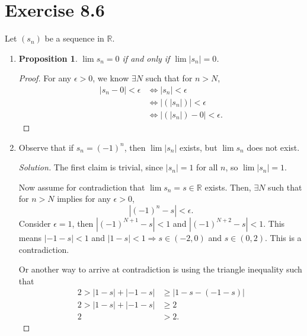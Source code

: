 \documentclass{article}
\newtheorem{proposition}[thm]{Proposition}
\begin{document}
\section*{Exercise 8.6}
Let $(s_n)$ be a sequence in $\mathbb{R}$.
\begin{enumerate}[label=(\alph*)]
    \item 
    \begin{proposition}
        $\lim s_n=0$ if and only if $\lim |s_n|=0$.
    \end{proposition}
    \begin{proof}
        For any $\epsilon>0$, we know $\exists N$ such that for $n>N$, 
        \begin{align*}
            |s_n-0| <\epsilon &\Leftrightarrow |s_n| < \epsilon \\
            &\Leftrightarrow |(|s_n|)| < \epsilon \\
            & \Leftrightarrow |(|s_n|)-0| < \epsilon.
        \end{align*}
    \end{proof}

    \item
    Observe that if $s_n = (-1)^n$, then $\lim|s_n|$ exists, but $\lim s_n$ does not exist.
    \begin{proof}[Solution]
        The first claim is trivial, since $|s_n| = 1$ for all $n$, so $\lim|s_n| = 1$.

        Now assume for contradiction that $\lim s_n = s\in\mathbb{R}$ exists. Then, $\exists N$
        such that for $n>N$ implies for any $\epsilon>0$, $$|(-1)^n-s|<\epsilon.$$
        Consider $\epsilon = 1$, then $|(-1)^{N+1}-s|<1$ and $|(-1)^{N+2}-s|<1$. This means 
        $|-1-s|<1$ and $|1-s|<1\Rightarrow s\in (-2,0)$ and $s\in (0,2)$. This is a contradiction.

        Or another way to arrive at contradiction is using the triangle inequality such that 
        \begin{align*}
            2 > |1-s| + |-1-s| & \ge |1-s-(-1-s)| \\
            2 > |1-s| + |-1-s| & \ge 2 \\
            2 & > 2.
        \end{align*}
    \end{proof}
\end{enumerate}
\end{document}

